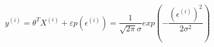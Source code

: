 
\begin{equation}
y^{\left(i\right)}=\theta^T X^{\left(i\right)} + \varepsilon 
p\left(\epsilon^{\left(i\right)}\right)=\frac{1}{\sqrt{2\pi}\sigma}exp\left(-\frac{\left(\epsilon^{\left(i\right)}\right)^2}{2\sigma^2}\right)
\end{equation}
